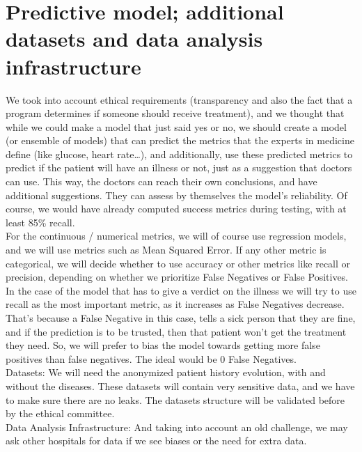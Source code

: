 \section{Predictive model; additional datasets and data analysis infrastructure}\label{sec:predictive-model:-additional-datasets-and-data-analysis-infrastructure}

We took into account ethical requirements (transparency and also the fact that a program determines if someone should receive treatment),
and we thought that while we could make a model that just said yes or no,
we should create a model (or ensemble of models) that can predict the metrics that the experts in medicine define (like glucose, heart rate\dots),
and additionally, use these predicted metrics to predict if the patient will have an illness or not, just as a suggestion that doctors can use.
This way, the doctors can reach their own conclusions, and have additional suggestions.
They can assess by themselves the model’s reliability.
Of course, we would have already computed success metrics during testing, with at least 85\% recall. \\

For the continuous / numerical metrics, we will of course use regression models, and we will use metrics such as Mean Squared Error.
If any other metric is categorical, we will decide whether to use accuracy or other metrics like recall or precision,
depending on whether we prioritize False Negatives or False Positives.
In the case of the model that has to give a verdict on the illness we will try to use recall as the most important metric,
as it increases as False Negatives decrease.
That’s because a False Negative in this case, tells a sick person that they are fine, and if the prediction is to be trusted,
then that patient won’t get the treatment they need.
So, we will prefer to bias the model towards getting more false positives than false negatives.
The ideal would be 0 False Negatives. \\

Datasets: We will need the anonymized patient history evolution, with and without the diseases.
These datasets will contain very sensitive data, and we have to make sure there are no leaks.
The datasets structure will be validated before by the ethical committee. \\

Data Analysis Infrastructure: And taking into account an old challenge,
we may ask other hospitals for data if we see biases or the need for extra data.


